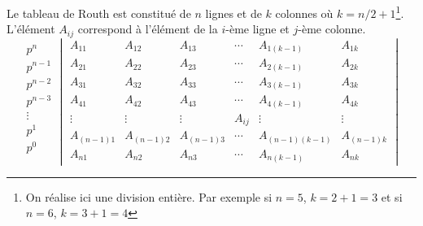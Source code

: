 Le tableau de Routh est constitué de $n$ lignes et de $k$ colonnes 
où $k=n/2+1$\footnote{On réalise ici une division entière. Par exemple 
si $n=5$, $k=2+1=3$ et si $n=6$, $k=3+1=4$}. L'élément $A_{ij}$ correspond 
à l'élément de la $i$-ème ligne et $j$-ème colonne.
\[
\begin{matrix}
    p^n    \\
    p^{n-1}\\
    p^{n-2}\\
    p^{n-3}\\
    \vdots \\
    p^1    \\
    p^0    \\
\end{matrix}
\begin{vmatrix}
  A_{11}     & A_{12}     & A_{13}     & \cdots & A_{1(k-1)}     & A_{1k}  \\
  A_{21}     & A_{22}     & A_{23}     & \cdots & A_{2(k-1)}     & A_{2k}  \\
  A_{31}     & A_{32}     & A_{33}     & \cdots & A_{3(k-1)}     & A_{3k}  \\
  A_{41}     & A_{42}     & A_{43}     & \cdots & A_{4(k-1)}     & A_{4k}  \\
  \vdots     & \vdots     & \vdots     & A_{ij} & \vdots         & \vdots  \\
  A_{(n-1)1} & A_{(n-1)2} & A_{(n-1)3} & \cdots & A_{(n-1)(k-1)} & A_{(n-1)k}\\
  A_{n1}     & A_{n2}     & A_{n3}     & \cdots & A_{n(k-1)}     & A_{nk}
\end{vmatrix}
\]

